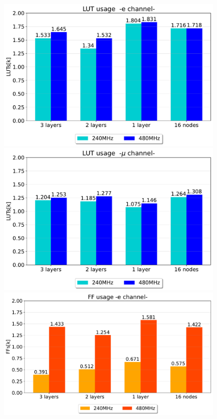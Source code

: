 \documentclass[../../main.tex]{subfiles}
\begin{document}
\begin{figure}[ht] 
  \label{ fig7} 
  \begin{minipage}[b]{0.5\linewidth}
    \centering
    \includegraphics[width=.82\linewidth]{sections/05/Images/LUT_usage_1ele_@480.pdf}  
    \vspace{4ex}
  \end{minipage}%
  \begin{minipage}[b]{0.5\linewidth}
    \centering
    \includegraphics[width=.82\linewidth]{sections/05/Images/LUT_usage_1mu_@480.pdf}
    \vspace{4ex}
  \end{minipage} 
  \begin{minipage}[b]{0.5\linewidth}
    \centering
    \includegraphics[width=.82\linewidth]{sections/05/Images/FF_usage1ele_@480.pdf} 

\end{minipage}
\end{figure}
\end{document}
